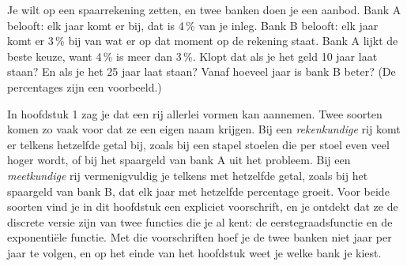 %


\begin{probleem}
Je wilt  op een spaarrekening zetten, en twee banken doen je een aanbod. Bank A belooft: elk jaar komt er  bij, dat is 4\,\% van je inleg. Bank B belooft: elk jaar komt er 3\,\% bij van wat er op dat moment op de rekening staat. Bank A lijkt de beste keuze, want 4\,\% is meer dan 3\,\%. Klopt dat als je het geld 10 jaar laat staan? En als je het 25 jaar laat staan? Vanaf hoeveel jaar is bank B beter? {\small(De percentages zijn een voorbeeld.)}
\end{probleem}


In hoofdstuk 1 zag je dat een rij allerlei vormen kan aannemen. Twee soorten komen zo vaak voor dat ze een eigen naam krijgen. Bij een \textit{rekenkundige} rij komt er telkens hetzelfde getal bij, zoals bij een stapel stoelen die per stoel even veel hoger wordt, of bij het spaargeld van bank A uit het probleem. Bij een \textit{meetkundige} rij vermenigvuldig je telkens met hetzelfde getal, zoals bij het spaargeld van bank B, dat elk jaar met hetzelfde percentage groeit. Voor beide soorten vind je in dit hoofdstuk een expliciet voorschrift, en je ontdekt dat ze de discrete versie zijn van twee functies die je al kent: de eerstegraadsfunctie en de exponentiële functie. Met die voorschriften hoef je de twee banken niet jaar per jaar te volgen, en op het einde van het hoofdstuk weet je welke bank je kiest.

